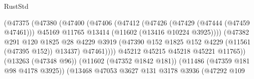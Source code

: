 \begin{lexlean}{RustStd}
\begin{coremodule}
                                              (@47375
                                                (@47380
                                                  (@47400
                                                    (@47406
                                                      (@47412
                                                        (@47426
                                                          (@47429 (@47444 (@47459 @47461)))
                                                          @45169
                                                          @11765
                                                          @13414
                                                          (@11602 (@13416 @10224 @3925))))
                                                      (@47382
                                                        @291
                                                        @120
                                                        @1825
                                                        @28
                                                        @4229
                                                        @3919
                                                        (@47390
                                                          @152
                                                          @1825
                                                          @152
                                                          @4229
                                                          (@11561 (@47395 @152))
                                                          @13437)
                                                        @47461))))
                                                @45212
                                                @45215
                                                @45218
                                                @45221
                                                @11765))
                                            (@13263 (@47348 @96))
                                            (@11602 (@47352 @1842 @181))
                                            (@11486 (@47359 @181 @98 @4178 @3925))
                                            (@13468
                                              @47053
                                              @3627
                                              @131
                                              @3178
                                              @3936
                                              (@47292
                                                @109

\end{coremodule}
\end{lexlean}
